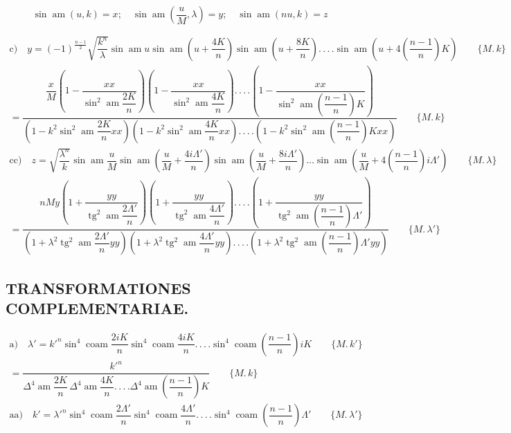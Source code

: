\documentclass{article}
\begin{document}
\[
\sin\operatorname{am}(u,k)=x;\quad \sin\operatorname{am}\left(\dfrac{u}{M},\lambda\right)=y;\quad \sin\operatorname{am}(nu,k)=z
\]

\[
\begin{gathered}
\text{c)}\quad y=(-1)^{\frac{n-1}{2}}\sqrt{\dfrac{k^{n}}{\lambda}}\sin\operatorname{am}u\sin\operatorname{am}\left(u+\dfrac{4K}{n}\right)\sin\operatorname{am}\left(u+\dfrac{8K}{n}\right).\,.\,.\,.\sin\operatorname{am}\left(u+4\left(\dfrac{n-1}{n}\right)K\right)\qquad\{M.\,k\}\\[1.5ex]
{}=\dfrac{\dfrac{x}{M}\left(1-\dfrac{xx}{\sin^{2}\operatorname{am}\dfrac{2K}{n}}\right)\left(1-\dfrac{xx}{\sin^{2}\operatorname{am}\dfrac{4K}{n}}\right).\,.\,.\,.\left(1-\dfrac{xx}{\sin^{2}\operatorname{am}\left(\dfrac{n-1}{n}\right)K}\right)}{\left(1-k^{2}\sin^{2}\operatorname{am}\dfrac{2K}{n}xx\right)\left(1-k^{2}\sin^{2}\operatorname{am}\dfrac{4K}{n}xx\right).\,.\,.\,.\left(1-k^{2}\sin^{2}\operatorname{am}\left(\dfrac{n-1}{n}\right)Kxx\right)}\qquad\{M.\,k\}\\[1.5ex]
\text{cc)}\quad z=\sqrt{\dfrac{\lambda^{n}}{k}}\sin\operatorname{am}\dfrac{u}{M}\sin\operatorname{am}\left(\dfrac{u}{M}+\dfrac{4i\Lambda'}{n}\right)\sin\operatorname{am}\left(\dfrac{u}{M}+\dfrac{8i\Lambda'}{n}\right)\ldots\sin\operatorname{am}\left(\dfrac{u}{M}+4\left(\dfrac{n-1}{n}\right)i\Lambda'\right)\qquad\{M.\,\lambda\}\\[1.5ex]
{}=\dfrac{nMy\left(1+\dfrac{yy}{\operatorname{tg}^{2}\operatorname{am}\dfrac{2\Lambda'}{n}}\right)\left(1+\dfrac{yy}{\operatorname{tg}^{2}\operatorname{am}\dfrac{4\Lambda'}{n}}\right).\,.\,.\,.\left(1+\dfrac{yy}{\operatorname{tg}^{2}\operatorname{am}\left(\dfrac{n-1}{n}\right)\Lambda'}\right)}{\left(1+\lambda^{2}\operatorname{tg}^{2}\operatorname{am}\dfrac{2\Lambda'}{n}yy\right)\left(1+\lambda^{2}\operatorname{tg}^{2}\operatorname{am}\dfrac{4\Lambda'}{n}yy\right).\,.\,.\,.\left(1+\lambda^{2}\operatorname{tg}^{2}\operatorname{am}\left(\dfrac{n-1}{n}\right)\Lambda'yy\right)}\qquad\{M.\,\lambda'\}
\end{gathered}
\]

\subsection*{TRANSFORMATIONES COMPLEMENTARIAE.}

\[
\begin{gathered}
\text{a)}\quad \lambda'=k'^{n}\sin^{4}\operatorname{coam}\dfrac{2iK}{n}\sin^{4}\operatorname{coam}\dfrac{4iK}{n}.\,.\,.\,.\sin^{4}\operatorname{coam}\left(\dfrac{n-1}{n}\right)iK\qquad\{M.\,k'\}\\[1.5ex]
{}=\dfrac{k'^{n}}{\Delta^{4}\operatorname{am}\dfrac{2K}{n}\,\Delta^{4}\operatorname{am}\dfrac{4K}{n}.\,.\,.\,.\Delta^{4}\operatorname{am}\left(\dfrac{n-1}{n}\right)K}\qquad\{M.\,k\}\\[1.5ex]
\text{aa)}\quad k'=\lambda'^{n}\sin^{4}\operatorname{coam}\dfrac{2\Lambda'}{n}\sin^{4}\operatorname{coam}\dfrac{4\Lambda'}{n}.\,.\,.\,.\sin^{4}\operatorname{coam}\left(\dfrac{n-1}{n}\right)\Lambda'\qquad\{M.\,\lambda'\}
\end{gathered}
\]
\end{document}
